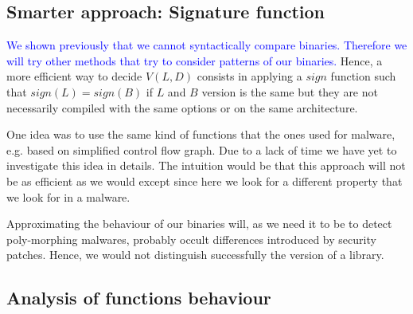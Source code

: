 \documentclass{article}
\newcommand{\ludo}[1]{\textcolor{blue}{#1}}
\newcommand{\signature}{{sign}}
\begin{document}
    \subsection{Smarter approach: Signature function}\label{approach-sign}

    \ludo{We shown previously that we cannot syntactically compare binaries.
    Therefore we will try other methods that try to consider patterns of our
    binaries.} Hence, a more efficient way to decide $V(L,D)$ consists in
    applying a $\signature$ function such that $\signature(L) = \signature(B)$
    if $L$ and $B$ version is the same but they are not necessarily
    compiled with the same options or on the same architecture.
	
    One idea was to use the same kind of functions that the ones used for malware, e.g.
    based on simplified control flow graph. Due to a lack of time we have yet 
    to investigate this idea in details. The intuition would be that this
    approach will not be as efficient as we would except since here we look
    for a different property that we look for in a malware. 
    
    Approximating the behaviour of our binaries will, as we need it to be to
    detect poly-morphing malwares, probably occult differences introduced by
    security patches. Hence, we would not distinguish successfully the version
    of a library.
	
	\subsection{Analysis of functions behaviour}
	

 

    
\end{document}
